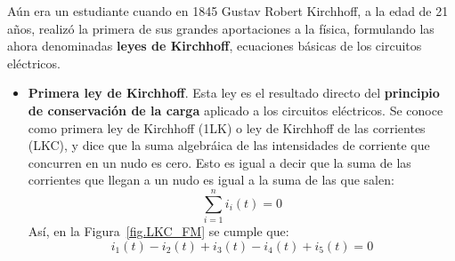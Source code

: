 	
	Aún era un estudiante cuando en 1845 Gustav Robert Kirchhoff, a la edad de 21 años, realizó la primera de sus grandes aportaciones a la física, formulando las ahora denominadas \textbf{leyes de Kirchhoff}, ecuaciones básicas de los circuitos eléctricos.
	
	\begin{itemize}
		\item \textbf{Primera ley de Kirchhoff}. Esta ley es el resultado directo del \textbf{principio de conservación de la carga} aplicado a los circuitos eléctricos. Se conoce como primera ley de Kirchhoff (1LK) o ley de Kirchhoff de las corrientes (LKC), y dice que la suma algebráica de las intensidades de corriente que concurren en un nudo es cero. Esto es igual a decir que la suma de las corrientes que llegan a un nudo es igual a la suma de las que salen: 
		\begin{equation}
			\boxed{\sum_{i=1}^n i_i(t)=0}
		\end{equation}
		Así, en la Figura~\ref{fig.LKC_FM} se cumple que:
		\begin{equation*}
			i_1(t) - i_2(t) + i_3(t) - i_4(t) + i_5(t) = 0
		\end{equation*}
		

\end{itemize}
